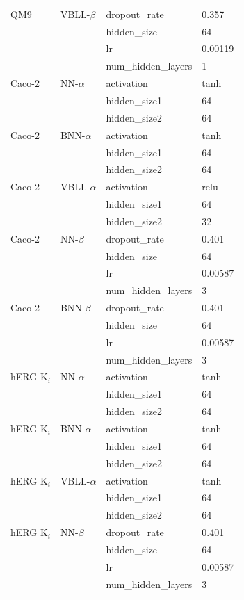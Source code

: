 {\begin{longtable}{@{}llll@{}}
\addlinespace
QM9 & VBLL-$\beta$ & dropout\_rate & 0.357 \\
 &  & hidden\_size & 64 \\
 &  & lr & 0.00119 \\
 &  & num\_hidden\_layers & 1 \\
\addlinespace
Caco-2 & NN-$\alpha$ & activation & tanh \\
 &  & hidden\_size1 & 64 \\
 &  & hidden\_size2 & 64 \\
\addlinespace
Caco-2 & BNN-$\alpha$ & activation & tanh \\
 &  & hidden\_size1 & 64 \\
 &  & hidden\_size2 & 64 \\
\addlinespace
Caco-2 & VBLL-$\alpha$ & activation & relu \\
 &  & hidden\_size1 & 64 \\
 &  & hidden\_size2 & 32 \\
\addlinespace
Caco-2 & NN-$\beta$ & dropout\_rate & 0.401 \\
 &  & hidden\_size & 64 \\
 &  & lr & 0.00587 \\
 &  & num\_hidden\_layers & 3 \\
\addlinespace
Caco-2 & BNN-$\beta$ & dropout\_rate & 0.401 \\
 &  & hidden\_size & 64 \\
 &  & lr & 0.00587 \\
 &  & num\_hidden\_layers & 3 \\
\addlinespace
hERG K$_i$ & NN-$\alpha$ & activation & tanh \\
 &  & hidden\_size1 & 64 \\
 &  & hidden\_size2 & 64 \\
\addlinespace
hERG K$_i$ & BNN-$\alpha$ & activation & tanh \\
 &  & hidden\_size1 & 64 \\
 &  & hidden\_size2 & 64 \\
\addlinespace
hERG K$_i$ & VBLL-$\alpha$ & activation & tanh \\
 &  & hidden\_size1 & 64 \\
 &  & hidden\_size2 & 64 \\
\addlinespace
hERG K$_i$ & NN-$\beta$ & dropout\_rate & 0.401 \\
 &  & hidden\_size & 64 \\
 &  & lr & 0.00587 \\
 &  & num\_hidden\_layers & 3 \\

\end{longtable}}
